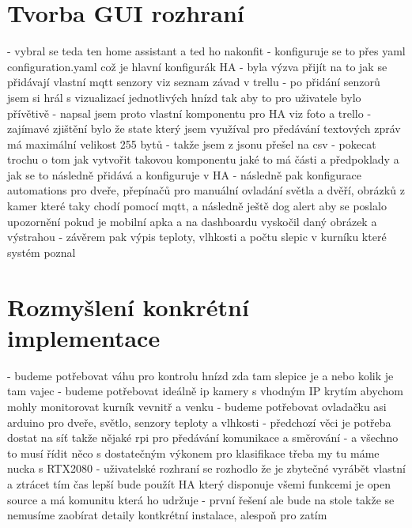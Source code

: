 \section{Tvorba GUI rozhraní}\label{sec:tvorba-gui-rozhrani}
- vybral se teda ten home assistant a ted ho nakonfit\newline
- konfiguruje se to přes yaml configuration.yaml což je hlavní konfigurák HA\newline
- byla výzva přijít na to jak se přidávají vlastní mqtt senzory viz seznam závad v trellu\newline
- po přidání senzorů jsem si hrál s vizualizací jednotlivých hnízd tak aby to pro uživatele bylo přívětivě\newline
- napsal jsem proto vlastní komponentu pro HA viz foto a trello\newline
- zajímavé zjištění bylo že state který jsem využíval pro předávání textových zpráv má maximální velikost 255 bytů\newline
- takže jsem z jsonu přešel na csv\newline
- pokecat trochu o tom jak vytvořit takovou komponentu jaké to má části a předpoklady a jak se to následně přidává a konfiguruje v HA\newline
- následně pak konfigurace automations pro dveře, přepínačů pro manuální ovladání světla a dvěří, obrázků z kamer které taky chodí pomocí mqtt, a následně ještě dog alert aby se poslalo upozornění pokud je mobilní apka a na dashboardu vyskočil daný obrázek a výstrahou\newline
- závěrem pak výpis teploty, vlhkosti a počtu slepic v kurníku které systém poznal\newline


\section{Rozmyšlení konkrétní implementace}\label{sec:rozmysleni-konkretni-implementace}
- budeme potřebovat váhu pro kontrolu hnízd zda tam slepice je a nebo kolik je tam vajec\newline
- budeme potřebovat ideálně ip kamery s vhodným IP krytím abychom mohly monitorovat kurník vevnitř a venku\newline
- budeme potřebovat ovladačku asi arduino pro dveře, světlo, senzory teploty a vlhkosti\newline
- předchozí věci je potřeba dostat na síť takže nějaké rpi pro předávání komunikace a směrování\newline
- a všechno to musí řídit něco s dostatečným výkonem pro klasifikace třeba my tu máme nucka s RTX2080\newline
- uživatelské rozhraní se rozhodlo že je zbytečné vyrábět vlastní a ztrácet tím čas lepší bude použít HA který disponuje všemi funkcemi je open source a má komunitu která ho udržuje
- první řešení ale bude na stole takže se nemusíme zaobírat detaily kontkrétní instalace, alespoň pro zatím


